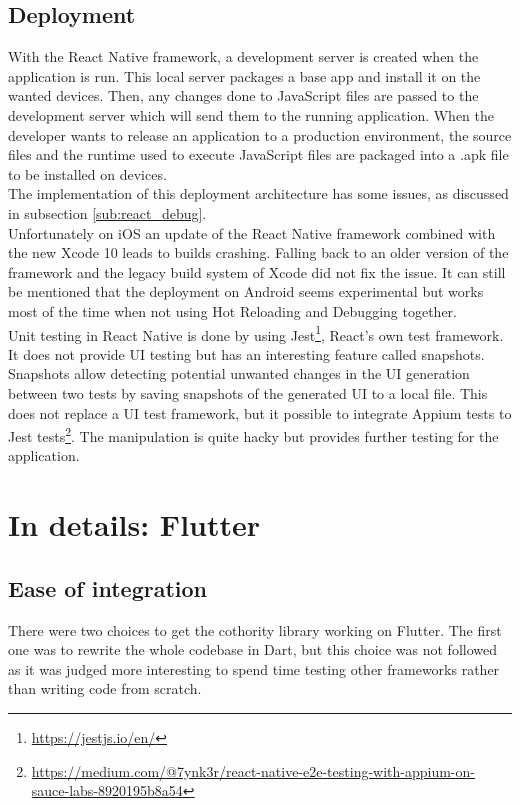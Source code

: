 \documentclass[11pt, a4paper, twoside, openright]{article} %
\begin{document}
{\subsection{Deployment}
\label{sub:appendix_react_deployment}
With the React Native framework, a development server is created when the application is run. This local server packages a base app and install it on the wanted devices. Then, any changes done to JavaScript files are passed to the development server which will send them to the running application. When the developer wants to release an application to a production environment, the source files and the runtime used to execute JavaScript files are packaged into a .apk file to be installed on devices.\\
The implementation of this deployment architecture has some issues, as discussed in subsection \ref{sub:react_debug}. \\
Unfortunately on iOS an update of the React Native framework combined with the new Xcode 10 leads to builds crashing. Falling back to an older version of the framework and the legacy build system of Xcode did not fix the issue. It can still be mentioned that the deployment on Android seems experimental but works most of the time when not using Hot Reloading and Debugging together.\\

Unit testing in React Native is done by using Jest\footnote{\url{https://jestjs.io/en/}}, React's own test framework. It does not provide UI testing but has an interesting feature called snapshots. Snapshots allow detecting potential unwanted changes in the UI generation between two tests by saving snapshots of the generated UI to a local file. This does not replace a UI test framework, but it possible to integrate Appium tests to Jest tests\footnote{\url{https://medium.com/@7ynk3r/react-native-e2e-testing-with-appium-on-sauce-labs-8920195b8a54}}. The manipulation is quite hacky but provides further testing for the application.

\section{In details: Flutter}
\subsection{Ease of integration}
\label{sub:appendix_flutter_integration}
There were two choices to get the cothority library working on Flutter. The first one was to rewrite the whole codebase in Dart, but this choice was not followed as it was judged more interesting to spend time testing other frameworks rather than writing code from scratch. \\

}
\end{document}
